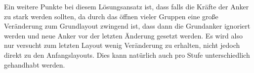Ein weitere Punkte bei diesem Lösungsansatz ist, dass falls die Kräfte der Anker zu stark werden sollten, 
da durch das öffnen vieler Gruppen eine große Veränderung zum Grundlayout zwingend ist, 
dass dann die Grundanker ignoriert werden und neue Anker vor der letzten Änderung gesetzt werden. 
Es wird also nur versucht zum letzten Layout wenig Veränderung zu erhalten, nicht jedoch direkt zu den Anfangslayouts. 
Dies kann natürlich auch pro Stufe unterschiedlich gehandhabt werden.


